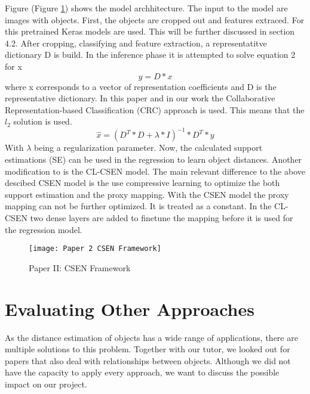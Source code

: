 \documentclass[a4paper, 11pt]{article}
\begin{document}
\begin{multicols}{2}
\begin{flushleft}
Figure (Figure \ref{fig:PaperII_SCEN}) shows the model archhitecture. The input to the model are images with objects. First, the objects are cropped out and features extraced. For this pretrained Keras models are used. This will be further discussed in section 4.2. After cropping, classifying and feature extraction, a representatitve dictionary D is build. In the inference phase it is attempted to solve equation 2 for x \begin{equation}\label{eq:y}
y = D*x
\end{equation}
where x corresponds to a vector of representation coefficients and D is the representative dictionary. In this paper and in our work the Collaborative Representation-based Classification (CRC) approach is used. This means that the $l_2$ solution is used. 
\begin{equation}\label{eq:x}
\hat{x} = (D^T * D + \lambda*I)^{-1} *D^T*y
\end{equation}
With $\lambda$ being a regularization parameter.
Now, the calculated support estimations (SE) can be used in the regression to learn object distances.
Another modification to \cite{CSEN} is the CL-CSEN model. The main relevant difference to the above descibed CSEN model is the use compressive learning to optimize the both support estimation and the proxy mapping. With the CSEN model the proxy mapping can not be further optimized. It is treated as a constant. In the CL-CSEN two dense layers are added to finetune the mapping before it is used for the regression model. 


\end{flushleft}
\begin{figure}[H]
\centering
\texttt{[image: Paper 2 CSEN Framework]}
\caption{Paper II: CSEN Framework}
\label{fig:PaperII_SCEN}
\end{figure}

\section{Evaluating Other Approaches}
\begin{flushleft}
As the distance estimation of objects has a wide range of applications, there are multiple solutions to this problem. Together with our tutor, we looked out for papers that also deal with relationships between objects. Although we did not have the capacity to apply every approach, we want to discuss the possible impact on our project.
\end{flushleft}


\end{multicols}
\end{document}

